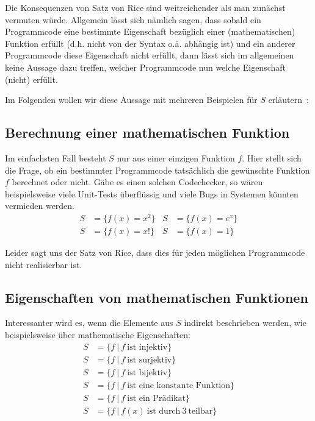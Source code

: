 \documentclass[journal]{IEEEtran}
\begin{document}
Die Konsequenzen von Satz von Rice sind weitreichender als man zunächst vermuten würde. Allgemein lässt sich nämlich sagen, dass sobald ein Programmcode eine bestimmte Eigenschaft bezüglich einer (mathematischen) Funktion erfüllt (d.h. nicht von der Syntax o.ä. abhängig ist) und ein anderer Programmcode diese Eigenschaft nicht erfüllt, dann lässt sich im allgemeinen keine Aussage dazu treffen, welcher Programmcode nun welche Eigenschaft (nicht) erfüllt.

Im Folgenden wollen wir diese Aussage mit mehreren Beispielen für $S$ erläutern~\cite{weiterebeispiele}:

\subsection{Berechnung einer mathematischen Funktion}

Im einfachsten Fall besteht $S$ nur aus einer einzigen Funktion $f$. Hier stellt sich die Frage, ob ein bestimmter Programmcode tatsächlich die gewünschte Funktion $f$ berechnet oder nicht. Gäbe es einen solchen Codechecker, so wären beispielsweise viele Unit-Tests überflüssig und viele Bugs in Systemen könnten vermieden werden.
\begin{align*}
S &= \{f(x) = x^2 \} &S &= \{ f(x) = e^x \} \\
S &= \{f(x) = x! \}  &S &= \{ f(x) = 1 \}
\end{align*}

Leider sagt uns der Satz von Rice, dass dies für jeden möglichen Programmcode nicht realisierbar ist.

\subsection{Eigenschaften von mathematischen Funktionen}

Interessanter wird es, wenn die Elemente aus $S$ indirekt beschrieben werden, wie beispielsweise über mathematische Eigenschaften:
\begin{align*}
S &= \{ f \ \vert \ f \ \text{ist injektiv} \} \\
S &= \{ f \ \vert \ f \ \text{ist surjektiv} \} \\
S &= \{ f \ \vert \ f \ \text{ist bijektiv} \} \\
S &= \{ f \ \vert \ f \ \text{ist eine konstante Funktion} \} \\
S &= \{ f \ \vert \ f \ \text{ist ein Prädikat} \} \\
S &= \{ f \ \vert \ f(x) \ \text{ist durch} \ 3 \ \text{teilbar} \} \\
\end{align*}
\end{document}
